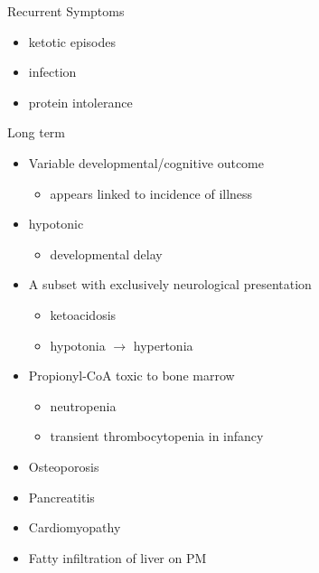 \documentclass[presentation, smaller]{beamer}
\begin{document}
\begin{frame}[label={sec:orgheadline20}]{Recurrent Symptoms}
\begin{itemize}
\item ketotic episodes
\item infection
\item protein intolerance
\end{itemize}
\end{frame}

\begin{frame}[label={sec:orgheadline21}]{Long term}
\begin{itemize}
\item Variable developmental/cognitive outcome
\begin{itemize}
\item appears linked to incidence of illness
\end{itemize}
\item hypotonic
\begin{itemize}
\item developmental delay
\end{itemize}
\item A subset with exclusively neurological presentation
\begin{itemize}
\item \textpm{} ketoacidosis
\item hypotonia \(\to\) hypertonia
\end{itemize}
\item Propionyl-CoA toxic to bone marrow
\begin{itemize}
\item neutropenia
\item transient thrombocytopenia in infancy
\end{itemize}
\item Osteoporosis
\item Pancreatitis
\item Cardiomyopathy
\item Fatty infiltration of liver on PM
\end{itemize}
\end{frame}
\end{document}
